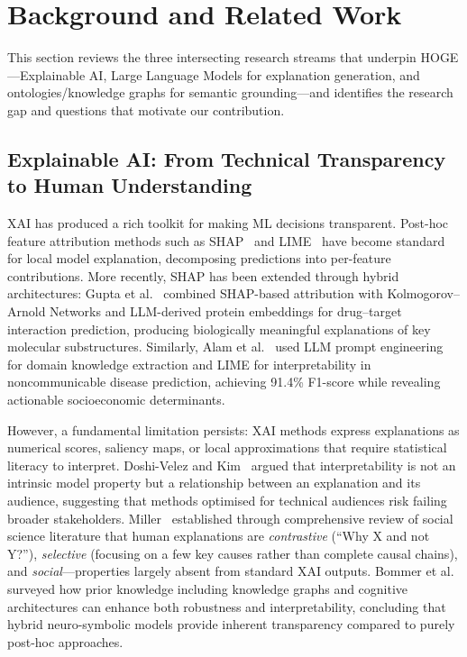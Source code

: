 \documentclass[lnbip]{svmultln}
\begin{document}
\section{Background and Related Work}

This section reviews the three intersecting research streams that underpin HOGE---Explainable AI, Large Language Models for explanation generation, and ontologies/knowledge graphs for semantic grounding---and identifies the research gap and questions that motivate our contribution.

\subsection{Explainable AI: From Technical Transparency to Human Understanding}

XAI has produced a rich toolkit for making ML decisions transparent. Post-hoc feature attribution methods such as SHAP~\cite{lundberg2017} and LIME~\cite{ribeiro2016} have become standard for local model explanation, decomposing predictions into per-feature contributions. More recently, SHAP has been extended through hybrid architectures: Gupta et al.~\cite{dti2025} combined SHAP-based attribution with Kolmogorov--Arnold Networks and LLM-derived protein embeddings for drug--target interaction prediction, producing biologically meaningful explanations of key molecular substructures. Similarly, Alam et al.~\cite{ncd2025} used LLM prompt engineering for domain knowledge extraction and LIME for interpretability in noncommunicable disease prediction, achieving 91.4\% F1-score while revealing actionable socioeconomic determinants.

However, a fundamental limitation persists: XAI methods express explanations as numerical scores, saliency maps, or local approximations that require statistical literacy to interpret. Doshi-Velez and Kim~\cite{doshi2017} argued that interpretability is not an intrinsic model property but a relationship between an explanation and its audience, suggesting that methods optimised for technical audiences risk failing broader stakeholders. Miller~\cite{miller2019} established through comprehensive review of social science literature that human explanations are \emph{contrastive} (``Why X and not Y?''), \emph{selective} (focusing on a few key causes rather than complete causal chains), and \emph{social}---properties largely absent from standard XAI outputs. Bommer et al.~\cite{priork2024} surveyed how prior knowledge including knowledge graphs and cognitive architectures can enhance both robustness and interpretability, concluding that hybrid neuro-symbolic models provide inherent transparency compared to purely post-hoc approaches.
\end{document}
